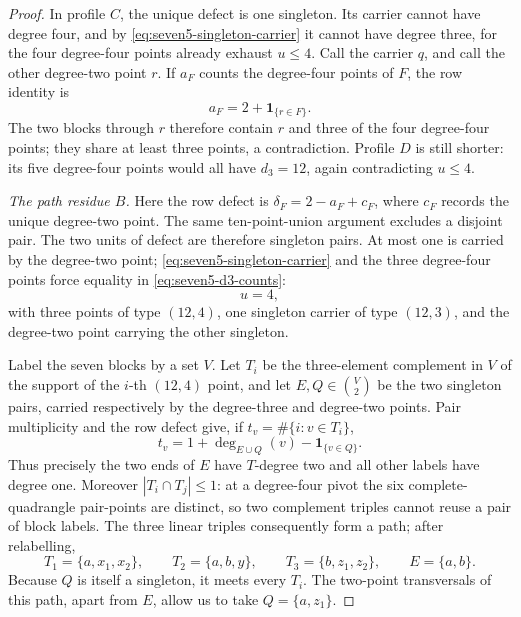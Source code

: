 \begin{proof}
In profile \(C\), the unique defect is one singleton.  Its carrier cannot
have degree four, and by \eqref{eq:seven5-singleton-carrier} it cannot have
degree three, for the four degree-four points already exhaust \(u\le4\).
Call the carrier \(q\), and call the other degree-two point \(r\).  If
\(a_F\) counts the degree-four points of \(F\), the row identity is
\[
 a_F=2+\mathbf1_{\{r\in F\}}.
\]
The two blocks through \(r\) therefore contain \(r\) and three of the four
degree-four points; they share at least three points, a contradiction.
Profile \(D\) is still shorter: its five degree-four points would all have
\(d_3=12\), again contradicting \(u\le4\).

\smallskip
\noindent\emph{The path residue \(B\).}
Here the row defect is
\(\delta_F=2-a_F+c_F\), where \(c_F\) records the unique degree-two point.
The same ten-point-union argument excludes a disjoint pair.  The two units
of defect are therefore singleton pairs.  At most one is carried by the
degree-two point; \eqref{eq:seven5-singleton-carrier} and the three
degree-four points force equality in \eqref{eq:seven5-d3-counts}:
\[
 u=4,
\]
with three points of type \((12,4)\), one singleton carrier of type
\((12,3)\), and the degree-two point carrying the other singleton.

Label the seven blocks by a set \(V\).  Let \(T_i\) be the three-element
complement in \(V\) of the support of the \(i\)-th \((12,4)\) point, and
let \(E,Q\in\binom V2\) be the two singleton pairs, carried respectively
by the degree-three and degree-two points.  Pair multiplicity and the row
defect give, if \(t_v=\#\{i:v\in T_i\}\),
\begin{equation}\label{eq:seven5-path-row}
 t_v=1+\deg_{E\cup Q}(v)-\mathbf1_{\{v\in Q\}}.
\end{equation}
Thus precisely the two ends of \(E\) have \(T\)-degree two and all other
labels have degree one.  Moreover \(|T_i\cap T_j|\le1\): at a degree-four
pivot the six complete-quadrangle pair-points are distinct, so two
complement triples cannot reuse a pair of block labels.  The three linear
triples consequently form a path;
after relabelling,
\[
 T_1=\{a,x_1,x_2\},\qquad
 T_2=\{a,b,y\},\qquad
 T_3=\{b,z_1,z_2\},\qquad E=\{a,b\}.
\]
Because \(Q\) is itself a singleton, it meets every \(T_i\).
The two-point transversals of this path, apart from \(E\), allow us to take
\(Q=\{a,z_1\}\).


\end{proof}
